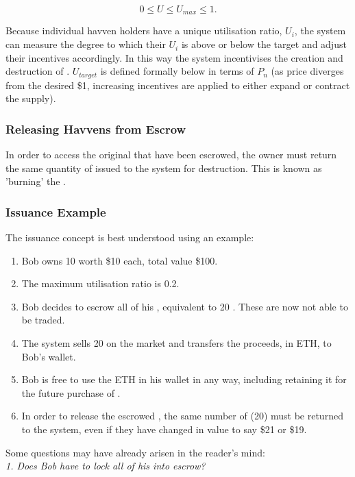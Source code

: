 $$ 0 \leq U \leq U_{max} \leq 1.$$

\noindent Because individual havven holders have a unique utilisation ratio, $ U_i $, the system can measure the degree to which their $ U_i $ is above or below the target and adjust their incentives accordingly. In this way the system incentivises the creation and destruction of \NOM{}. $ U_{target} $ is defined formally below in terms of $ P_n $ (as \NOM{} price diverges from the desired \$1, increasing incentives are applied to either expand or contract the supply).

\subsubsection{Releasing Havvens from Escrow}

\noindent In order to access the original \HAV{} that have been escrowed, the owner must return the same quantity of issued \NOM{} to the system for destruction. This is known as 'burning' the \NOM{}.

\subsubsection{Issuance Example}

\noindent The issuance concept is best understood using an example:
\begin{enumerate}
\item{Bob owns 10 \HAV{} worth \$10 each, total value \$100.}
\item{The maximum utilisation ratio is 0.2.}
\item{Bob decides to escrow all of his \HAV{}, equivalent to 20 \NOM{}. These \HAV{} are now not able to be traded.}
\item{The system sells 20 \NOM{} on the market and transfers the proceeds, in ETH, to Bob's wallet.}
\item{Bob is free to use the ETH in his wallet in any way, including retaining it for the future purchase of \NOM{}.}
\item{In order to release the escrowed \HAV{}, the same number of \NOM{} (20) must be returned to the system, even if they have changed in value to say \$21 or \$19.}
\end{enumerate} 

\noindent Some questions may have already arisen in the reader's mind: \\

\noindent \emph{1. Does Bob have to lock all of his \HAV{} into escrow?} \\ 

